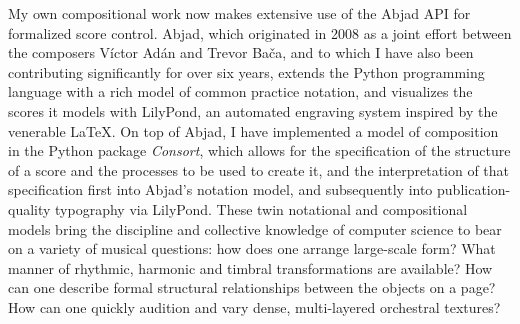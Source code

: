 My own compositional work now makes extensive use of the Abjad API for
formalized score control.\cite{baca2011xi, baca2015tenor,
trevino2013compositional} Abjad, which originated in 2008 as a joint effort
between the composers V\'{i}ctor Ad\'{a}n and Trevor Ba\v{c}a, and to which I
have also been contributing significantly for over six years, extends the
Python\cite{vanrossum2003ys} programming language with a rich model of common
practice notation, and visualizes the scores it models with
LilyPond\cite{nienhuys2003ve}, an automated engraving system inspired by the
venerable \LaTeX{}. On top of Abjad, I have implemented a model of composition
in the Python package \emph{Consort}, which allows for the specification of the
structure of a score and the processes to be used to create it, and the
interpretation of that specification first into Abjad's notation model, and
subsequently into publication-quality typography via LilyPond. These twin
notational and compositional models bring the discipline and collective
knowledge of computer science to bear on a variety of musical questions: how
does one arrange large-scale form? What manner of rhythmic, harmonic and
timbral transformations are available? How can one describe formal structural
relationships between the objects on a page? How can one quickly audition and
vary dense, multi-layered orchestral textures?


